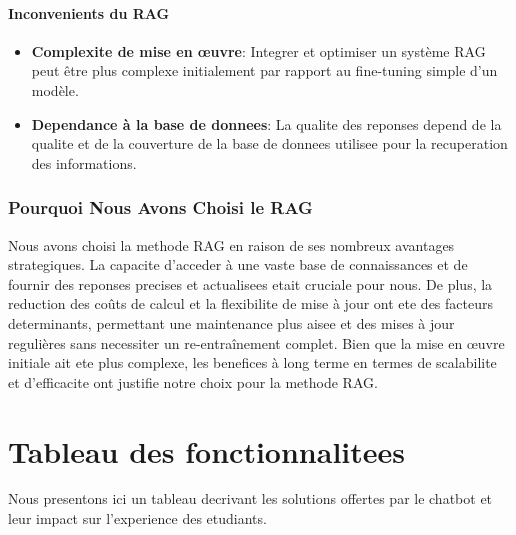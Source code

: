 \documentclass[a4paper, 11pt, openany]{report}
\begin{document}
\paragraph{Inconvenients du RAG}
\begin{itemize}
    \item \textbf{Complexite de mise en œuvre}: Integrer et optimiser un système RAG peut être plus complexe initialement par rapport au fine-tuning simple d'un modèle.
    \item \textbf{Dependance à la base de donnees}: La qualite des reponses depend de la qualite et de la couverture de la base de donnees utilisee pour la recuperation des informations.
\end{itemize}

\subsubsection{Pourquoi Nous Avons Choisi le RAG}
Nous avons choisi la methode RAG en raison de ses nombreux avantages strategiques. La capacite d'acceder à une vaste base de connaissances et de fournir des reponses precises et actualisees etait cruciale pour nous. De plus, la reduction des coûts de calcul et la flexibilite de mise à jour ont ete des facteurs determinants, permettant une maintenance plus aisee et des mises à jour regulières sans necessiter un re-entraînement complet. Bien que la mise en œuvre initiale ait ete plus complexe, les benefices à long terme en termes de scalabilite et d'efficacite ont justifie notre choix pour la methode RAG.


\section{Tableau des fonctionnalitees}
Nous presentons ici un tableau decrivant les solutions offertes par le chatbot et leur impact sur l'experience des etudiants.
\end{document}
